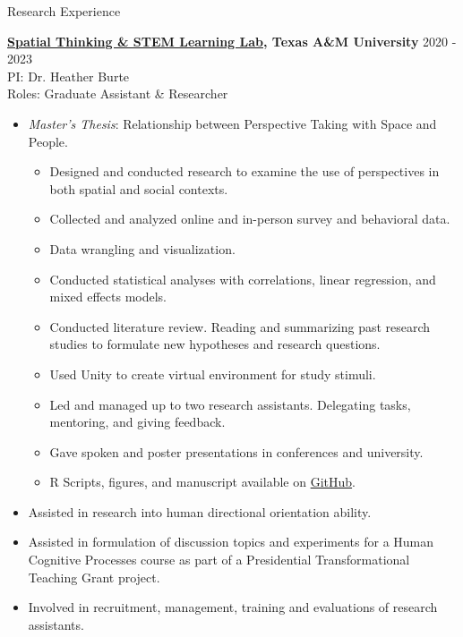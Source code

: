 \documentclass{resume} %
\begin{document}
\begin{rSection}{Research Experience}
    
    {\bf \href{https://burtelab.sites.tamu.edu/}{Spatial Thinking \& STEM 
    Learning Lab}, 
        Texas A\&M University}
    \hfill { 2020 - 2023}
    \\PI: Dr. Heather Burte
    \\Roles: Graduate Assistant \& Researcher
    
    \begin{itemize}[nosep]
        
        \item \emph{Master's Thesis}: Relationship between Perspective Taking 
        with Space and People.
            \begin{itemize}
                \item Designed and conducted research to examine the use of perspectives in both spatial and social contexts.
                \item Collected and analyzed online and in-person survey and behavioral data.
                \item Data wrangling and visualization.
                \item Conducted statistical analyses with correlations, linear regression, and mixed effects models.
                \item Conducted literature review. Reading and summarizing past research studies to formulate new hypotheses and research questions.
                \item Used Unity to create virtual environment for study stimuli.
                \item Led and managed up to two research assistants. Delegating tasks, mentoring, and giving feedback.
                \item Gave spoken and poster presentations in conferences and university.
                \item R Scripts, figures, and manuscript available on \href{https://github.com/sjp117/spatialSocialPerspectiveTaking}{GitHub}.
            \end{itemize}
        \item Assisted in research into human directional orientation ability.
        \item Assisted in formulation of discussion topics and experiments for 
        a Human Cognitive Processes course as part of a Presidential 
        Transformational Teaching Grant project.
        \item Involved in recruitment, management, training and evaluations of research assistants.
        

\end{itemize}
\end{rSection}
\end{document}

